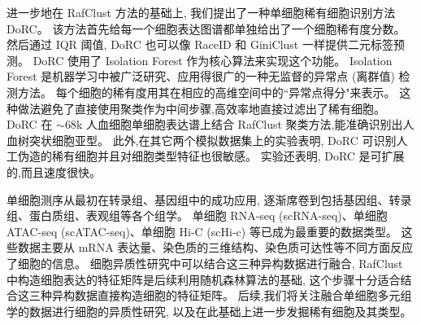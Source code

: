 
进一步地在 RafClust 方法的基础上, 我们提出了一种单细胞稀有细胞识别方法 DoRC。
该方法首先给每一个细胞表达图谱都单独给出了一个细胞稀有度分数。
然后通过 IQR 阈值, DoRC 也可以像 RaceID 和 GiniClust 一样提供二元标签预测。
DoRC 使用了 Isolation Forest 作为核心算法来实现这个功能。
Isolation Forest 是机器学习中被广泛研究、应用得很广的一种无监督的异常点 (离群值) 检测方法。
每个细胞的稀有度用其在相应的高维空间中的``异常点得分"来表示。
这种做法避免了直接使用聚类作为中间步骤,高效率地直接过滤出了稀有细胞。
DoRC 在 ${\sim}68$k 人血细胞单细胞表达谱上结合 RafClust 聚类方法,能准确识别出人血树突状细胞亚型。
此外,在其它两个模拟数据集上的实验表明, DoRC 可识别人工伪造的稀有细胞并且对细胞类型特征也很敏感。
实验还表明, DoRC 是可扩展的,而且速度很快。

单细胞测序从最初在转录组、基因组中的成功应用, 逐渐席卷到包括基因组、转录组、蛋白质组、表观组等各个组学。
单细胞 RNA-seq (scRNA-seq)、单细胞 ATAC-seq (scATAC-seq)、单细胞 Hi-C (scHi-c) 等已成为最重要的数据类型。
这些数据主要从 mRNA 表达量、染色质的三维结构、染色质可达性等不同方面反应了细胞的信息。
细胞异质性研究中可以结合这三种异构数据进行融合, RafClust 中构造细胞表达的特征矩阵是后续利用随机森林算法的基础,
这个步骤十分适合结合这三种异构数据直接构造细胞的特征矩阵。
后续,我们将关注融合单细胞多元组学的数据进行细胞的异质性研究, 以及在此基础上进一步发掘稀有细胞及其类型。

